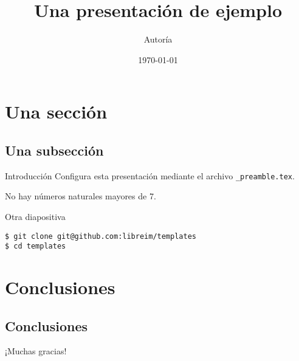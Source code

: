 

\title{Una presentación de ejemplo}
\date{\today}
\author{Autoría}


\maketitle
\begin{frame}{\contentsname}
  \tableofcontents
\end{frame}

\section{Una sección}
\subsection{Una subsección}
\begin{frame}{Introducción}
  Configura esta \alert{presentación} mediante el archivo \texttt{\_preamble.tex}.
  
  \begin{theorem}
    No hay números naturales mayores de 7.
  \end{theorem}
\end{frame}

\begin{frame}[fragile]{Otra diapositiva}
\begin{verbatim}
$ git clone git@github.com:libreim/templates
$ cd templates
\end{verbatim}
\end{frame}

\section{Conclusiones}
\subsection{Conclusiones}
\begin{frame}[standout]
  ¡Muchas gracias!
\end{frame}


